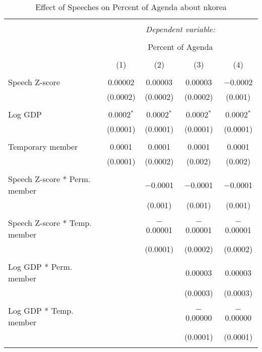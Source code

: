
\begin{table}[!htbp] \centering 
  \caption{Effect of Speeches on Percent of Agenda about nkorea} 
  \label{} 
\begin{tabular}{@{\extracolsep{5pt}}lcccc} 
\\[-1.8ex]\hline 
\hline \\[-1.8ex] 
 & \multicolumn{4}{c}{\textit{Dependent variable:}} \\ 
\cline{2-5} 
\\[-1.8ex] & \multicolumn{4}{c}{Percent of Agenda} \\ 
\\[-1.8ex] & (1) & (2) & (3) & (4)\\ 
\hline \\[-1.8ex] 
 Speech Z-score & 0.00002 & 0.00003 & 0.00003 & $-$0.0002 \\ 
  & (0.0002) & (0.0002) & (0.0002) & (0.001) \\ 
  & & & & \\ 
 Log GDP & 0.0002$^{*}$ & 0.0002$^{*}$ & 0.0002$^{*}$ & 0.0002$^{*}$ \\ 
  & (0.0001) & (0.0001) & (0.0001) & (0.0001) \\ 
  & & & & \\ 
 Temporary member & 0.0001 & 0.0001 & 0.0001 & 0.0001 \\ 
  & (0.0001) & (0.0002) & (0.002) & (0.002) \\ 
  & & & & \\ 
 Speech Z-score * Perm. member &  & $-$0.0001 & $-$0.0001 & $-$0.0001 \\ 
  &  & (0.001) & (0.001) & (0.001) \\ 
  & & & & \\ 
 Speech Z-score * Temp. member &  & $-$0.00001 & $-$0.00001 & $-$0.00001 \\ 
  &  & (0.0001) & (0.0002) & (0.0002) \\ 
  & & & & \\ 
 Log GDP * Perm. member &  &  & 0.00003 & 0.00003 \\ 
  &  &  & (0.0003) & (0.0003) \\ 
  & & & & \\ 
 Log GDP * Temp. member &  &  & $-$0.00000 & $-$0.00000 \\ 
  &  &  & (0.0001) & (0.0001) \\ 
  & & & & \\ 

\end{tabular}
\end{table}
